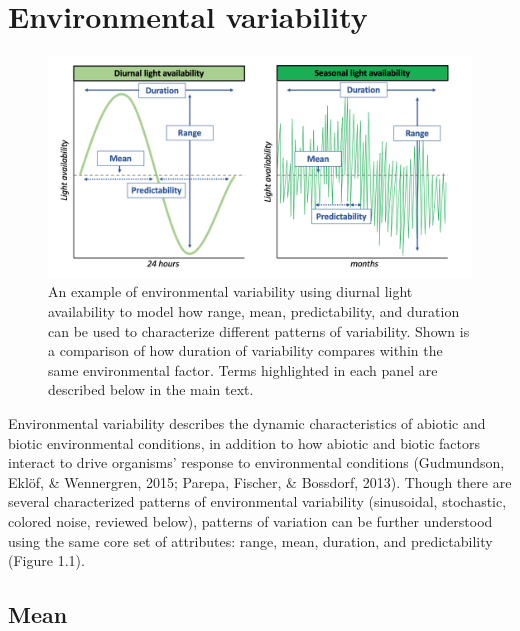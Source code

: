 \documentclass[12pt,twoside]{reedthesis}
\begin{document}
\hypertarget{environmental-variability}{%
\section{Environmental variability}\label{environmental-variability}}
\begin{figure}

{\centering \includegraphics[width=1.05\linewidth]{figures/figure1} 

}

\caption[Metrics to describe and explain environmental variability.]{An example of environmental variability using diurnal light availability to model how range, mean, predictability, and duration can be used to characterize different patterns of variability. Shown is a comparison of how duration of variability compares within the same environmental factor. Terms highlighted in each panel are described below in the main text.}\label{fig:unnamed-chunk-3}
\end{figure}
Environmental variability describes the dynamic characteristics of abiotic and biotic environmental conditions, in addition to how abiotic and biotic factors interact to drive organisms' response to environmental conditions (Gudmundson, Eklöf, \& Wennergren, 2015; Parepa, Fischer, \& Bossdorf, 2013). Though there are several characterized patterns of environmental variability (sinusoidal, stochastic, colored noise, reviewed below), patterns of variation can be further understood using the same core set of attributes: range, mean, duration, and predictability (Figure 1.1).

\hypertarget{mean}{%
\subsection{Mean}\label{mean}}
\end{document}
